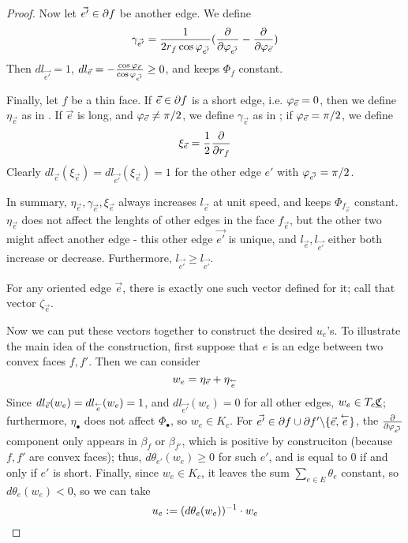 \begin{proof}
Now let $\vec{e'} \in \partial f$ be another edge.
We define
\begin{equation}
\label{e:gamma_e}
\gamma_{\vec{e'}} = \frac{1}{2 r_f \cos{\varphi_{\vec{e'}}}}
	({\frac{\partial}{\partial \varphi_{\vec{e'}}}} - {\frac{\partial}{\partial \varphi_{\vec{e}}}})
\end{equation}
Then $dl_{\vec{e'}} = 1$,
$dl_{\vec{e}} = -\frac{\cos \varphi_{\vec{e}}}{\cos \varphi_{\vec{e'}}} \geq 0$,
and keeps $\Phi_f$ constant.


Finally, let $f$ be a thin face.
If $\vec{e} \in \partial f$ is a short edge,
i.e. $\varphi_{\vec{e}} = 0$,
then we define $\eta_{\vec{e}}$ as in .
If $\vec{e}$ is long, and $\varphi_{\vec{e}} \neq \pi/2$,
we define $\gamma_{\vec{e}}$ as in ;
if $\varphi_{\vec{e}} = \pi/2$, we define
\begin{equation}
\label{e:xi_e}
\xi_{\vec{e}} = \frac{1}{2}{\frac{\partial}{\partial r_f}}
\end{equation}
Clearly $dl_{\vec{e}}(\xi_{\vec{e}}) = dl_{\vec{e'}}(\xi_{\vec{e}}) = 1$
for the other edge $e'$ with $\varphi_{\vec{e'}} = \pi/2$.


In summary,
$\eta_{\vec{e}}, \gamma_{\vec{e}}, \xi_{\vec{e}}$
always increases $l_{\vec{e}}$ at unit speed,
and keeps $\Phi_{f_{\vec{e}}}$ constant.
$\eta_{\vec{e}}$ does not affect the lenghts of other edges
in the face $f_{\vec{e}}$,
but the other two might affect another edge
- this other edge $\vec{e'}$ is unique,
and $l_{\vec{e}}, l_{\vec{e'}}$ either both increase
or decrease.
Furthermore, $l_{\vec{e'}} \geq l_{\vec{e'}}$.


For any oriented edge $\vec{e}$,
there is exactly one such vector defined for it;
call that vector $\zeta_{\vec{e}}$.


Now we can put these vectors together to construct the desired $u_e$'s.
To illustrate the main idea of the construction,
first suppose that $e$ is an edge between two convex faces $f,f'$.
Then we can consider
\[
w_e = \eta_{\vec{e}} + \eta_{\overset{\leftarrow}{e}}
\]
Since $dl_{\vec{e}}(w_e) = dl_{\overset{\leftarrow}{e}}(w_e) = 1$,
and $dl_{\vec{e'}}(w_e) = 0$ for all other edges,
$w_e \in T_c {\underline{\mathfrak{C}}}$;
furthermore, $\eta_\bullet$ does not affect $\Phi_\bullet$,
so $w_e \in K_c$.
For $\vec{e'} \in \partial f \cup \partial f' \backslash \{\vec{e},\overset{\leftarrow}{e}\}$,
the ${\frac{\partial}{\partial \varphi_{\vec{e'}}}}$ component only appears in $\beta_f$
or $\beta_{f'}$, which is positive by construciton
(because $f,f'$ are convex faces);
thus, $d\theta_{e'}(w_e) \geq 0$ for such $e'$, and
is equal to 0 if and only if $e'$ is short.
Finally, since $w_e \in K_c$, it leaves the sum $\sum_{e\in E} \theta_e$
constant, so $d\theta_e(w_e) < 0$, so we can take
\begin{equation}
\label{e:u_e}
u_e := (d\theta_e(w_e))^{-1} \cdot w_e
\end{equation}



\end{proof}
